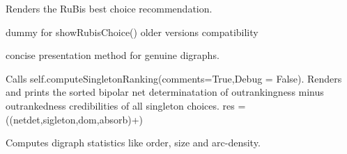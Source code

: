 \documentclass[letterpaper,10pt,english]{sphinxmanual}
\begin{document}
\begin{fulllineitems}
\begin{fulllineitems}
\end{fulllineitems}


\begin{fulllineitems}
\label{techDoc:digraphs.Digraph.showRubisBestChoiceRecommendation}
Renders the RuBis best choice recommendation.

\end{fulllineitems}


\begin{fulllineitems}
\label{techDoc:digraphs.Digraph.showRubyChoice}
dummy for showRubisChoice()
older versions compatibility

\end{fulllineitems}


\begin{fulllineitems}
\label{techDoc:digraphs.Digraph.showShort}
concise presentation method for genuine digraphs.

\end{fulllineitems}


\begin{fulllineitems}
\label{techDoc:digraphs.Digraph.showSingletonRanking}
Calls self.computeSingletonRanking(comments=True,Debug = False).
Renders and prints the sorted bipolar net determinatation of outrankingness
minus outrankedness credibilities of all singleton choices.
res = ((netdet,sigleton,dom,absorb)+)

\end{fulllineitems}


\begin{fulllineitems}
\label{techDoc:digraphs.Digraph.showStatistics}
Computes digraph statistics like order, size and arc-density.


\end{fulllineitems}
\end{fulllineitems}
\end{document}
